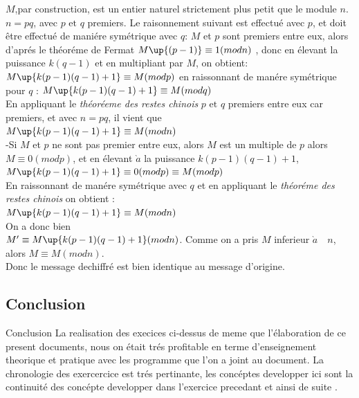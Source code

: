 \documentclass[10pt]{beamer}
\begin{document}
\begin{frame}

$M$,par construction, est un entier naturel strictement plus petit que le module $n$. $n = pq$, avec $p \text{ et } q $ premiers. Le raisonnement suivant est effectu\'{e} avec $p$, et doit \^{e}tre effectu\'{e} de mani\'{e}re sym\'{e}trique avec $q$:
$M$ et $p$ sont premiers entre eux, alors d'apr\'{e}s le th\'{e}or\'{e}me de Fermat $M\up{(p-1)} \equiv 1 (mod n)$ , donc en \'{e}levant la puissance $k(q-1)$ et en multipliant par $M$, on obtient:
\\$M\up{k(p-1)(q-1) +1} \equiv M (mod p)$ en raissonnant de man\'{e}re sym\'{e}trique pour $q$ : $M\up{k(p-1)(q-1) +1} \equiv M (mod q)$ 
\\ En appliquant le \emph{th\'{e}or\'{e}eme des restes chinois} $p \text{ et } q $ premiers entre eux car premiers, et avec $n = pq$, il vient que 
\\$M\up{k(p-1)(q-1) +1} \equiv M (mod n)$ 
\\-Si $M$ et $p$ ne sont pas premier entre eux, alors $M$ est un multiple de $p$ alors $M \equiv 0 (mod p)$, et en \'{e}levant  $\grave{a}$ la puissance $k(p-1)(q-1) + 1$, $M\up{k(p-1)(q-1) +1} \equiv 0 (mod p) \equiv M (mod p)$
\\En raissonnant de man\'{e}re sym\'{e}trique avec $q$ et en appliquant le \emph{th\'{e}or\'{e}me des restes chinois} on obtient : 
\\$M\up{k(p-1)(q-1) +1} \equiv M (mod n)$ 
\\On a donc bien 
\\$M' \equiv M\up{k(p-1)(q-1)+1} (mod n)$. Comme on a pris $M$ inferieur $\grave{a} \quad n$, alors $M \equiv M (mod n)$.
\\Donc le message dechiffr\'{e} est bien identique au message d'origine.


\end{frame}






\begin{frame}

\section{Conclusion}
\begin{block}{Conclusion}
La realisation des execices ci-dessus de meme que l'\'{e}laboration de ce present documents, nous on \'{e}tait tr\'{e}s profitable en terme d'enseignement theorique et pratique avec les programme que l'on a joint au document. La chronologie des exercercice est tr\'{e}s pertinante, les conc\'{e}ptes developper ici sont la continuit\'{e} des conc\'{e}pte developper dans l'exercice precedant et ainsi de suite .
\end{block}

\end{frame}
\end{document}
